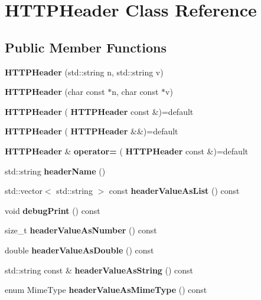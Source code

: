 \section{H\+T\+T\+P\+Header Class Reference}
\label{classHTTPHeader}
\subsection*{Public Member Functions}
\begin{DoxyCompactItemize}
\item 
\mbox{\label{classHTTPHeader_a5a57afcefddff1bbc5b15f50f557355b}} 
{\bfseries H\+T\+T\+P\+Header} (std\+::string n, std\+::string v)
\item 
\mbox{\label{classHTTPHeader_ab588e8dae7d0297267fab03c9547ddb4}} 
{\bfseries H\+T\+T\+P\+Header} (char const $\ast$n, char const $\ast$v)
\item 
\mbox{\label{classHTTPHeader_ab37422329cc8a709d34342fe47c79ba2}} 
{\bfseries H\+T\+T\+P\+Header} (\textbf{ H\+T\+T\+P\+Header} const \&)=default
\item 
\mbox{\label{classHTTPHeader_aad49a4f893697516bae62488b44b3060}} 
{\bfseries H\+T\+T\+P\+Header} (\textbf{ H\+T\+T\+P\+Header} \&\&)=default
\item 
\mbox{\label{classHTTPHeader_a13fed32daedaa35702c7d42c0f5480b7}} 
\textbf{ H\+T\+T\+P\+Header} \& {\bfseries operator=} (\textbf{ H\+T\+T\+P\+Header} const \&)=default
\item 
\mbox{\label{classHTTPHeader_a4249488653f0315579afa554377eb870}} 
std\+::string {\bfseries header\+Name} ()
\item 
\mbox{\label{classHTTPHeader_a7f344c98722d1df2439d167ef497f7cd}} 
std\+::vector$<$ std\+::string $>$ const {\bfseries header\+Value\+As\+List} () const
\item 
\mbox{\label{classHTTPHeader_acffe987ed02e62521c496f9f4a9c8c76}} 
void {\bfseries debug\+Print} () const
\item 
\mbox{\label{classHTTPHeader_a52499494b5027a65d1c4f673ea316424}} 
size\+\_\+t {\bfseries header\+Value\+As\+Number} () const
\item 
\mbox{\label{classHTTPHeader_a0a3d24267e28430718539d1ca9ac1d43}} 
double {\bfseries header\+Value\+As\+Double} () const
\item 
\mbox{\label{classHTTPHeader_ae61129429f37d47ea9ab445824102b7e}} 
std\+::string const  \& {\bfseries header\+Value\+As\+String} () const
\item 
\mbox{\label{classHTTPHeader_a2cfdafdb97e9152ac3111cc802bdb349}} 
enum Mime\+Type {\bfseries header\+Value\+As\+Mime\+Type} () const
\end{DoxyCompactItemize}
